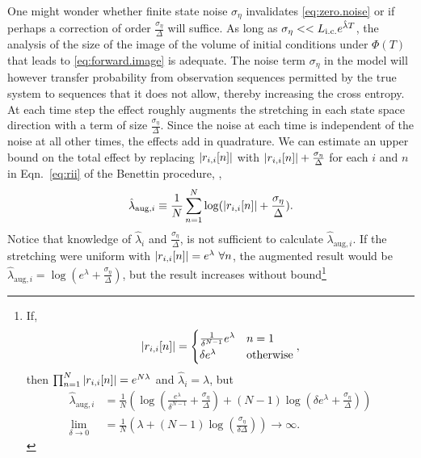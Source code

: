 One might wonder whether finite state noise $\sigma_\eta$ invalidates
\eqref{eq:zero.noise} or if perhaps a correction of order
$\frac{\sigma_\eta}{\Delta}$ will suffice.  As long as $\sigma_\eta <<
L_{\text{i.c.}} e^{\hat \lambda T}$, the analysis of the size of the image of the
volume of initial conditions under $\Phi(T)$ that leads to
\eqref{eq:forward.image} is adequate.  The noise term $\sigma_\eta$ in
the model will however transfer probability from observation sequences
permitted by the true system to sequences that it does not allow,
thereby increasing the cross entropy.  At each time step the effect
roughly augments the stretching in each state space direction with a
term of size $\frac{\sigma_\eta}{\Delta}$.  Since the noise at each
time is independent of the noise at all other times, the effects add
in quadrature.  We can estimate an upper bound on the total effect by
replacing $ \left| {r_{i,i}}{[n]} \right|$ with $ \left|
  {r_{i,i}}{[n]} \right| + \frac{\sigma_\eta}{\Delta}$ for each $i$
and $n$ in Eqn.~\eqref{eq:rii} of the Benettin procedure, \ie,
\begin{equation}
  \label{eq:LE.aug}
  \hat \lambda_{\text{aug},i} \equiv \frac{1}{N}  \sum_{n=1}^N \log( \left|
    {r_{i,i}}{[n]} \right|  + \frac{\sigma_\eta}{\Delta}).
\end{equation}
Notice that knowledge of $\hat \lambda_i$ and
$\frac{\sigma_\eta} {\Delta}$, is not sufficient to calculate
$\hat \lambda_{\text{aug},i}$.  If the stretching were uniform with
$\left| {r_{i,i}}{[n]} \right| = e^{\lambda} ~\forall n$, the
augmented result would be
$\hat \lambda_{\text{aug},i} = \log\left( e^\lambda +
  \frac{\sigma_\eta} {\Delta} \right)$, but the result increases
without bound\footnote{If,
  \begin{equation*}
     \left| {r_{i,i}}{[n]} \right| = \begin{cases}
       \frac{1}{\delta^{N-1}} e^\lambda & n=1\\
       \delta e^\lambda & \text{otherwise} \end{cases},
   \end{equation*}
   then $\prod_{n=1}^N \left| {r_{i,i}}{[n]} \right| = e^{N\lambda}$
   and $\hat \lambda_i = \lambda$, but
   \begin{align*}
   \hat \lambda_{\text{aug},i} &=
   \frac{1}{N} \left(
     \log\left(
       \frac{e^\lambda}{\delta^{N-1}} + \frac{\sigma_\eta}{\Delta}
     \right) +
     (N-1) \log\left( \delta e^\lambda + \frac{\sigma_\eta}{\Delta}
     \right) 
                            \right) \\
    \lim_{\delta \to 0} &= \frac{1}{N}
   \left( \lambda + (N-1) \log
     \left( \frac{\sigma_\eta}{\delta\Delta} \right)
   \right) \rightarrow \infty.
   \end{align*}
 } %
